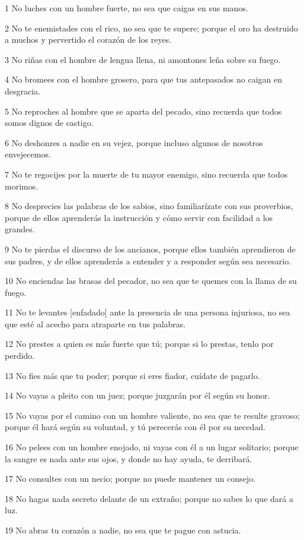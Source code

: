 \par 1 No luches con un hombre fuerte, no sea que caigas en sus manos.
\par 2 No te enemistades con el rico, no sea que te supere; porque el oro ha destruido a muchos y pervertido el corazón de los reyes.
\par 3 No riñas con el hombre de lengua llena, ni amontones leña sobre su fuego.
\par 4 No bromees con el hombre grosero, para que tus antepasados ​​no caigan en desgracia.
\par 5 No reproches al hombre que se aparta del pecado, sino recuerda que todos somos dignos de castigo.
\par 6 No deshonres a nadie en su vejez, porque incluso algunos de nosotros envejecemos.
\par 7 No te regocijes por la muerte de tu mayor enemigo, sino recuerda que todos morimos.
\par 8 No desprecies las palabras de los sabios, sino familiarízate con sus proverbios, porque de ellos aprenderás la instrucción y cómo servir con facilidad a los grandes.
\par 9 No te pierdas el discurso de los ancianos, porque ellos también aprendieron de sus padres, y de ellos aprenderás a entender y a responder según sea necesario.
\par 10 No enciendas las brasas del pecador, no sea que te quemes con la llama de su fuego.
\par 11 No te levantes [enfadado] ante la presencia de una persona injuriosa, no sea que esté al acecho para atraparte en tus palabras.
\par 12 No prestes a quien es más fuerte que tú; porque si lo prestas, tenlo por perdido.
\par 13 No fies más que tu poder; porque si eres fiador, cuídate de pagarlo.
\par 14 No vayas a pleito con un juez; porque juzgarán por él según su honor.
\par 15 No vayas por el camino con un hombre valiente, no sea que te resulte gravoso; porque él hará según su voluntad, y tú perecerás con él por su necedad.
\par 16 No pelees con un hombre enojado, ni vayas con él a un lugar solitario; porque la sangre es nada ante sus ojos, y donde no hay ayuda, te derribará.
\par 17 No consultes con un necio; porque no puede mantener un consejo.
\par 18 No hagas nada secreto delante de un extraño; porque no sabes lo que dará a luz.
\par 19 No abras tu corazón a nadie, no sea que te pague con astucia.

